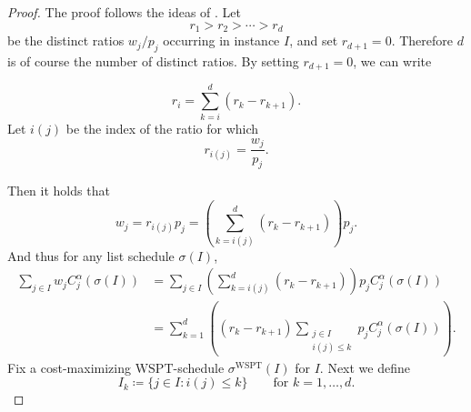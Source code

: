 \documentclass[%
english, titlepage=false %
]{./tum-templates/book/tumbook}
\begin{document}
\begin{proof}
The proof follows the ideas of \cite{Schwiegelshohn:2011}.
Let
\[
        r_1>r_2>\cdots>r_d
\]
be the distinct ratios $w_j/p_j$ occurring in instance $I$, and set $r_{d+1}=0$.
Therefore $d$ is of course the number of distinct ratios. 
By setting $r_{d+1}=0$, we can write

\[
        r_i=\sum_{k=i}^d (r_k-r_{k+1}).
\]
Let $i(j)$ be the index  of the ratio for which
\[
      r_{i(j)}=\frac{w_j}{p_j}.
\]

Then it holds that
\[
        w_j
        =
        r_{i(j)}p_j
        =
        \left(\sum_{k=i(j)}^d (r_k-r_{k+1})\right)p_j.
\]
And thus for any list schedule $\sigma(I)$,
\begin{equation}
    \label{eq: Ik identity}
\begin{aligned}
        \sum_{j\in I} w_j C_j^{\alpha}(\sigma(I))
        &=
        \sum_{j\in I}
        \left(
            \sum_{k=i(j)}^d (r_k-r_{k+1})
        \right)p_j C_j^{\alpha}(\sigma(I))                                      \\
        &=
        \sum_{k=1}^d \left((r_k-r_{k+1})
        \sum_{\substack{j\in I\\ i(j)\leq k}} p_j C_j^{\alpha}(\sigma(I))\right).
\end{aligned}
\end{equation}
Fix a cost-maximizing $\mathrm{WSPT}$-schedule $\sigma^{\mathrm{WSPT}}(I)$ for $I$.
Next we define
\[
        I_k \coloneqq \{j\in I: i(j)\leq k\} \qquad \text{for } k=1,\ldots,d.
\]


\end{proof}
\end{document}
